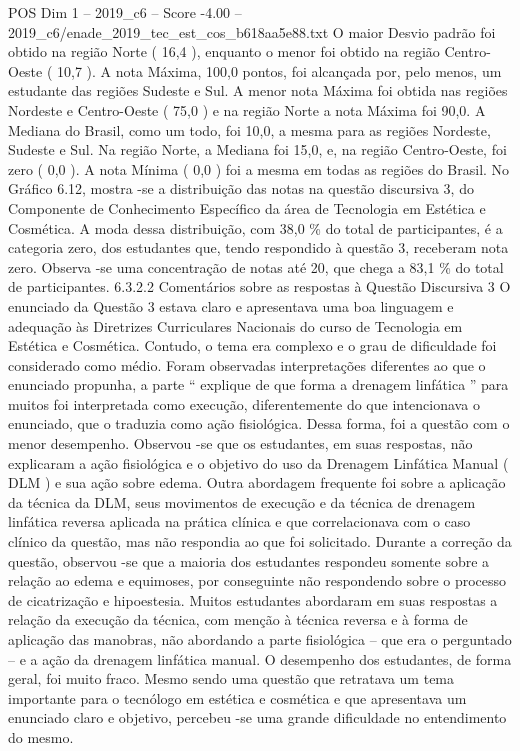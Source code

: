 \begin{textsample}{POS Dim 1 – 2019\_c6 – Score -4.00 – 2019\_c6/enade\_2019\_tec\_est\_cos\_b618aa5e88.txt}
O maior Desvio padrão foi obtido na região Norte ( 16,4 ), enquanto o menor foi obtido na região Centro-Oeste ( 10,7 ).
A nota Máxima, 100,0 pontos, foi alcançada por, pelo menos, um estudante das regiões Sudeste e Sul.
A menor nota Máxima foi obtida nas regiões Nordeste e Centro-Oeste ( 75,0 ) e na região Norte a nota Máxima foi 90,0.
A Mediana do Brasil, como um todo, foi 10,0, a mesma para as regiões Nordeste, Sudeste e Sul.
Na região Norte, a Mediana foi 15,0, e, na região Centro-Oeste, foi zero ( 0,0 ).
A nota Mínima ( 0,0 ) foi a mesma em todas as regiões do Brasil.
No Gráfico 6.12, mostra -se a distribuição das notas na questão discursiva 3, do Componente de Conhecimento Específico da área de Tecnologia em Estética e Cosmética.
A moda dessa distribuição, com 38,0 \% do total de participantes, é a categoria zero, dos estudantes que, tendo respondido à questão 3, receberam nota zero.
Observa -se uma concentração de notas até 20, que chega a 83,1 \% do total de participantes. 6.3.2.2 Comentários sobre as respostas à Questão Discursiva 3 O enunciado da Questão 3 estava claro e apresentava uma boa linguagem e adequação às Diretrizes Curriculares Nacionais do curso de Tecnologia em Estética e Cosmética.
Contudo, o tema era complexo e o grau de dificuldade foi considerado como médio.
Foram observadas interpretações diferentes ao que o enunciado propunha, a parte “ explique de que forma a drenagem linfática ” para muitos foi interpretada como execução, diferentemente do que intencionava o enunciado, que o traduzia como ação fisiológica.
Dessa forma, foi a questão com o menor desempenho.
Observou -se que os estudantes, em suas respostas, não explicaram a ação fisiológica e o objetivo do uso da Drenagem Linfática Manual ( DLM ) e sua ação sobre edema.
Outra abordagem frequente foi sobre a aplicação da técnica da DLM, seus movimentos de execução e da técnica de drenagem linfática reversa aplicada na prática clínica e que correlacionava com o caso clínico da questão, mas não respondia ao que foi solicitado.
Durante a correção da questão, observou -se que a maioria dos estudantes respondeu somente sobre a relação ao edema e equimoses, por conseguinte não respondendo sobre o processo de cicatrização e hipoestesia.
Muitos estudantes abordaram em suas respostas a relação da execução da técnica, com menção à técnica reversa e à forma de aplicação das manobras, não abordando a parte fisiológica – que era o perguntado – e a ação da drenagem linfática manual.
O desempenho dos estudantes, de forma geral, foi muito fraco.
Mesmo sendo uma questão que retratava um tema importante para o tecnólogo em estética e cosmética e que apresentava um enunciado claro e objetivo, percebeu -se uma grande dificuldade no entendimento do mesmo.

\end{textsample}
